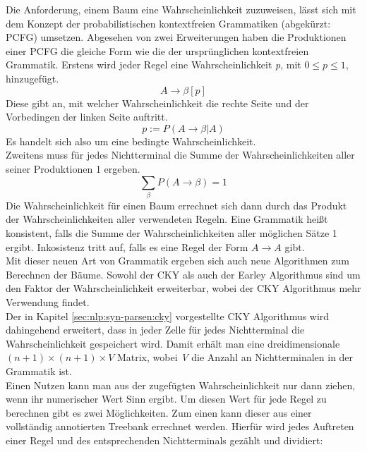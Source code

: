 Die Anforderung, einem Baum eine Wahrscheinlichkeit zuzuweisen, lässt sich mit dem Konzept der probabilistischen kontextfreien Grammatiken (abgekürzt: PCFG) umsetzen. Abgesehen von zwei Erweiterungen haben die Produktionen einer PCFG die gleiche Form wie die der ursprünglichen kontextfreien Grammatik. Erstens wird jeder Regel eine Wahrscheinlichkeit \textit{p}, mit \( 0 \leq p \leq 1 \), hinzugefügt.
\begin{equation}
A \to \beta  [p]
\end{equation}
Diese gibt an, mit welcher Wahrscheinlichkeit die rechte Seite und der Vorbedingen der linken Seite auftritt.
\begin{equation}
p := P(A \to \beta | A)
\end{equation}
Es handelt sich also um eine bedingte Wahrscheinlichkeit.\\ 
Zweitens muss für jedes Nichtterminal die Summe der Wahrscheinlichkeiten aller seiner Produktionen 1 ergeben.
\begin{equation}
\sum_{\beta} P(A \to \beta) = 1
\end{equation}
Die Wahrscheinlichkeit für einen Baum errechnet sich dann durch das Produkt der Wahrscheinlichkeiten aller verwendeten Regeln. Eine Grammatik heißt konsistent, falls die Summe der Wahrscheinlichkeiten aller möglichen Sätze 1 ergibt. Inkosistenz tritt auf, falls es eine Regel der Form \( A \to A \) gibt.\\
Mit dieser neuen Art von Grammatik ergeben sich auch neue Algorithmen zum Berechnen der Bäume. Sowohl der CKY als auch der Earley Algorithmus sind um den Faktor der Wahrscheinlichkeit erweiterbar, wobei der CKY Algorithmus mehr Verwendung findet.\\
Der in Kapitel \ref{sec:nlp:syn-parsen:cky} vorgestellte CKY Algorithmus wird dahingehend erweitert, dass in jeder Zelle für jedes Nichtterminal die Wahrscheinlichkeit gespeichert wird. Damit erhält man eine dreidimensionale \( (n+1) \times (n+1) \times V\) Matrix, wobei \textit{V} die Anzahl an Nichtterminalen in der Grammatik ist. \\
Einen Nutzen kann man aus der zugefügten Wahrscheinlichkeit nur dann ziehen, wenn ihr numerischer Wert Sinn ergibt. Um diesen Wert für jede Regel zu berechnen gibt es zwei Möglichkeiten. Zum einen kann dieser aus einer vollständig annotierten Treebank errechnet werden. Hierfür wird jedes Auftreten einer Regel und des entsprechenden Nichtterminals gezählt und dividiert: 
